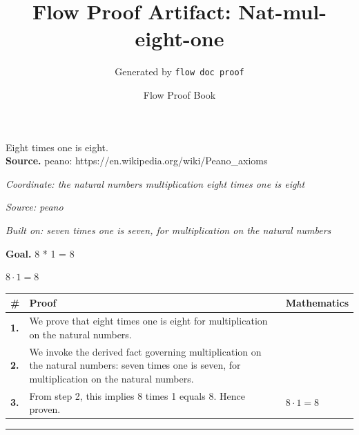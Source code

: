 \documentclass[11pt]{article}
\title{Flow Proof Artifact: Nat-mul-eight-one}
\author{Generated by \texttt{flow doc proof}}
\date{Flow Proof Book}
\theoremstyle{definition}
\begin{document}
\maketitle
Eight times one is eight.\\[0.5em]
\textbf{Source.} peano: https://en.wikipedia.org/wiki/Peano\_axioms\\[0.5em]
\bigskip
{}\par
\smallskip\noindent\textit{Coordinate: the natural numbers \cdot multiplication \cdot eight times one is eight}\par
\smallskip\noindent\textit{Source: peano}\par
\smallskip\noindent\textit{Built on: seven times one is seven, for multiplication on the natural numbers}\par
\medskip
\noindent\textbf{Goal.} 8 * 1 = 8\par
\noindent$\displaystyle 8 \cdot 1 = 8$\par
\medskip
\noindent
\begin{tabular}{@{} >{\raggedright\arraybackslash}p{} >{\raggedright\arraybackslash}p{} >{\raggedleft\arraybackslash}p{} @{}}
\textbf{\#} & \textbf{Proof} & \textbf{Mathematics} \\
\midrule
\textbf{1.} & We prove that eight times one is eight for multiplication on the natural numbers. & \\[0.45em]
\textbf{2.} & We invoke the derived fact governing multiplication on the natural numbers: seven times one is seven, for multiplication on the natural numbers. & \\[0.45em]
\textbf{3.} & From step 2, this implies 8 times 1 equals 8. Hence proven. & $\displaystyle 8 \cdot 1 = 8$ \\[0.45em]
\bottomrule
\end{tabular}
\label{thm:Nat-multiplication-eight_times_one_is_eight}
\par\medskip\hrule
\end{document}
